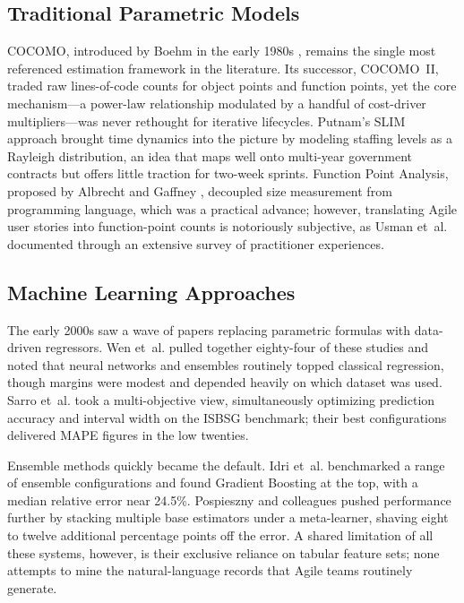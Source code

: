 \documentclass[conference]{IEEEtran}
\begin{document}
\subsection{Traditional Parametric Models}

COCOMO, introduced by Boehm in the early 1980s \cite{boehm1981}, remains the single most referenced estimation framework in the literature. Its successor, COCOMO~II, traded raw lines-of-code counts for object points and function points, yet the core mechanism---a power-law relationship modulated by a handful of cost-driver multipliers---was never rethought for iterative lifecycles. Putnam's SLIM approach \cite{putnam1978} brought time dynamics into the picture by modeling staffing levels as a Rayleigh distribution, an idea that maps well onto multi-year government contracts but offers little traction for two-week sprints. Function Point Analysis, proposed by Albrecht and Gaffney \cite{albrecht1979}, decoupled size measurement from programming language, which was a practical advance; however, translating Agile user stories into function-point counts is notoriously subjective, as Usman et~al. \cite{usman2014} documented through an extensive survey of practitioner experiences.

\subsection{Machine Learning Approaches}

The early 2000s saw a wave of papers replacing parametric formulas with data-driven regressors. Wen et~al. \cite{wen2012} pulled together eighty-four of these studies and noted that neural networks and ensembles routinely topped classical regression, though margins were modest and depended heavily on which dataset was used. Sarro et~al. \cite{sarro2016} took a multi-objective view, simultaneously optimizing prediction accuracy and interval width on the ISBSG benchmark; their best configurations delivered MAPE figures in the low twenties.

Ensemble methods quickly became the default. Idri et~al. \cite{idri2016} benchmarked a range of ensemble configurations and found Gradient Boosting at the top, with a median relative error near 24.5\%. Pospieszny and colleagues \cite{pospieszny2018} pushed performance further by stacking multiple base estimators under a meta-learner, shaving eight to twelve additional percentage points off the error. A shared limitation of all these systems, however, is their exclusive reliance on tabular feature sets; none attempts to mine the natural-language records that Agile teams routinely generate.
\end{document}

